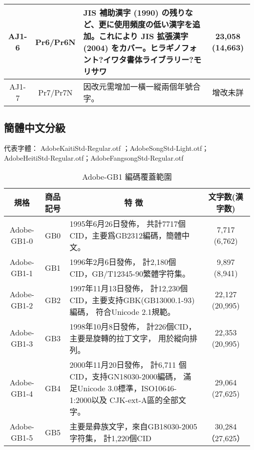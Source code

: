 \begin{appendix}
\begin{table}[h]
\begin{tabular}{|c|c|p{8cm}|c|}
\hline
AJ1-6	& Pr6/Pr6N	&  JIS 補助漢字 (1990)
の残りなど、更に使用頻度の低い漢字を追加。これにより JIS 拡張漢字
(2004) をカバー。ヒラギノフォント?イワタ書体ライブラリー?モリサワ
& 23,058 (14,663) \\

\hline
AJ1-7	& Pr7/Pr7N	&  因改元需增加一橫一縱兩個年號合字。 & 增改未詳 \\

\hline %
\end{tabular}

\end{table}

\clearpage
\subsection{簡體中文分級}
{\gtfamily 代表字體： AdobeKaitiStd-Regular.otf ；AdobeSongStd-Light.otf；\\
\qquad \qquad \qquad AdobeHeitiStd-Regular.otf；AdobeFangsongStd-Regular.otf}
\begin{table}[h]
\caption{\fontsize{12pt}{15pt}\selectfont Adobe-GB1 編碼覆蓋範圍} %
\centering %
\begin{tabular}{|c|c|p{8cm}|c|}%
\hline  %

規格 & 商品記号	& \multicolumn{1}{|c|}{特 徴} & 文字数(漢字数) \\

\hline  %
Adobe-GB1-0 &	GB0	 & 1995年6月26日發佈，
共計7717個CID，主要爲GB2312編碼，簡體中文。
& 7,717 (6,762) \\
\hline
Adobe-GB1-1	& GB1 &	1996年2月6日發佈，
計2,180個CID，GB/T12345-90繁體字符集。
& 	9,897 (8,941) \\
\hline
Adobe-GB1-2	& GB2	 &  1997年11月13日發佈，
計12,230個CID，主要支持GBK(GB13000.1-93)編碼，
符合Unicode 2.1規範。 & 22,127 (20,995) \\
\hline

Adobe-GB1-3	& GB3	&   1998年10月8日發佈，
計226個CID，主要是旋轉的拉丁文字，
用於縱向排列。 & 22,353 (20,995) \\

\hline
Adobe-GB1-4	& GB4 & 2000年11月20日發佈，
計6,711 個CID，支持GN18030-2000編碼，
滿足Unicode 3.0標準，ISO10646-1:2000以及 CJK-ext-A區的全部文字。
& 29,064 (27,625) \\
\hline
Adobe-GB1-5	& GB5 & 主要是彜族文字，來自GB18030-2005字符集，
計1,220個CID & 30,284（27,625） \\


\end{tabular}
\end{table}
\end{appendix}
